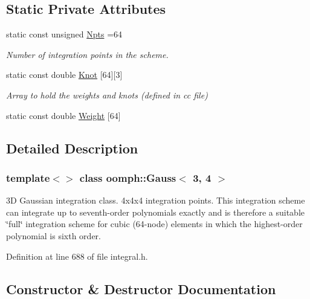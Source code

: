 \subsection*{Static Private Attributes}
\begin{DoxyCompactItemize}
\item 
static const unsigned \hyperlink{classoomph_1_1Gauss_3_013_00_014_01_4_a359a6f461bc51c7abd755d36828e1c12}{Npts} =64
\begin{DoxyCompactList}\small\item\em Number of integration points in the scheme. \end{DoxyCompactList}\item 
static const double \hyperlink{classoomph_1_1Gauss_3_013_00_014_01_4_a0e5dfa717c94114012925da0bdaa2c84}{Knot} \mbox{[}64\mbox{]}\mbox{[}3\mbox{]}
\begin{DoxyCompactList}\small\item\em Array to hold the weights and knots (defined in cc file) \end{DoxyCompactList}\item 
static const double \hyperlink{classoomph_1_1Gauss_3_013_00_014_01_4_a47cc0e47ba2d5217fde73a9fa4ccac06}{Weight} \mbox{[}64\mbox{]}
\end{DoxyCompactItemize}


\subsection{Detailed Description}
\subsubsection*{template$<$$>$\newline
class oomph\+::\+Gauss$<$ 3, 4 $>$}

3D Gaussian integration class. 4x4x4 integration points. This integration scheme can integrate up to seventh-\/order polynomials exactly and is therefore a suitable \char`\"{}full\char`\"{} integration scheme for cubic (64-\/node) elements in which the highest-\/order polynomial is sixth order. 

Definition at line 688 of file integral.\+h.



\subsection{Constructor \& Destructor Documentation}
\mbox{\label{classoomph_1_1Gauss_3_013_00_014_01_4_a0d4ce17acee33dc7c52f98916b8e9f33}} 

